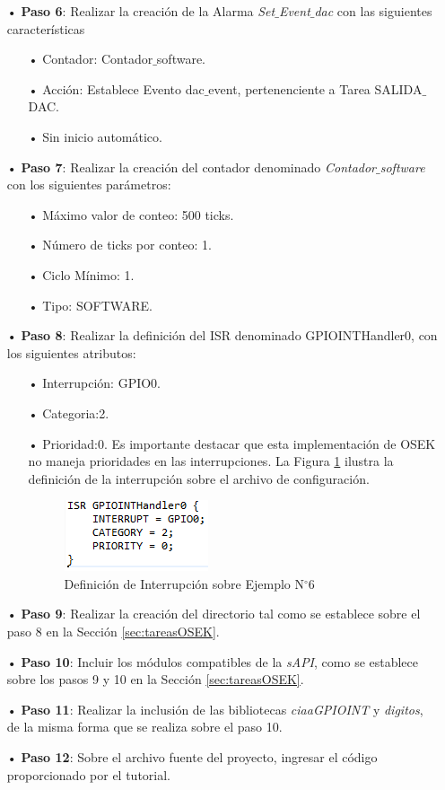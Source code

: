\documentclass[12pt,letterpaper]{article}
\begin{document}
\begin{enumerate}
\item[•]\textbf{Paso 6}: Realizar la creación de la Alarma \textit{Set$\_$Event$\_$dac} con las siguientes características
\begin{enumerate}
\item[•]Contador: Contador$\_$software.
\item[•]Acción: Establece Evento dac$\_$event, pertenenciente a Tarea SALIDA$\_$DAC.
\item[•]Sin inicio automático.
\end{enumerate}

\item[•]\textbf{Paso 7}: Realizar la creación del contador denominado \textit{Contador$\_$software} con los siguientes parámetros:
\begin{enumerate}
\item[•]Máximo valor de conteo: 500 ticks.
\item[•]Número de ticks por conteo: 1. 
\item[•]Ciclo Mínimo: 1.
\item[•]Tipo: SOFTWARE.
\end{enumerate}

\item[•]\textbf{Paso 8}: Realizar la definición del ISR denominado GPIOINTHandler0, con los siguientes atributos:
\begin{enumerate}
\item[•]Interrupción: GPIO0.
\item[•]Categoria:2.
\item[•]Prioridad:0. Es importante destacar que esta implementación de OSEK no maneja prioridades en las interrupciones. La Figura \ref{defintej6} ilustra la definición de la interrupción sobre el archivo de configuración.
\begin{figure}[H]
\centering
\includegraphics[width=5 cm]{figuras/f34.png}
\caption{Definición de Interrupción sobre Ejemplo N$^{\circ}$6}
\label{defintej6}
\end{figure}
\end{enumerate}
\item[•]\textbf{Paso 9}: Realizar la creación del directorio tal como se establece sobre el paso 8 en la Sección \ref{sec:tareasOSEK}.
\item[•]\textbf{Paso 10}: Incluir los módulos compatibles de la \textit{sAPI}, como se establece sobre los pasos 9 y 10 en la Sección \ref{sec:tareasOSEK}.
\item[•]\textbf{Paso 11}: Realizar la inclusión de las bibliotecas \textit{ciaaGPIOINT} y \textit{digitos}, de la misma forma que se realiza sobre el paso 10.
\item[•]\textbf{Paso 12}: Sobre el archivo fuente del proyecto, ingresar el código proporcionado por el tutorial.

\end{enumerate}
\end{document}
